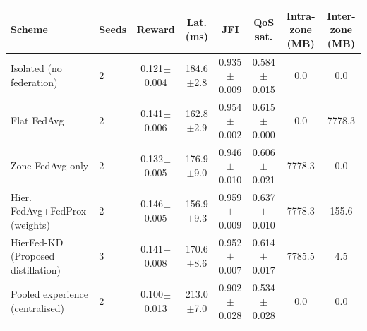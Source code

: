 \begin{tabular}{llcccccc}
\toprule
Scheme & Seeds & Reward & Lat. (ms) & JFI & QoS sat. & Intra-zone (MB) & Inter-zone (MB) \\
\midrule
Isolated (no federation) & 2 & 0.121{\tiny$\pm$0.004} & 184.6{\tiny$\pm$2.8} & 0.935{\tiny$\pm$0.009} & 0.584{\tiny$\pm$0.015} & 0.0 & 0.0 \\
Flat FedAvg & 2 & 0.141{\tiny$\pm$0.006} & 162.8{\tiny$\pm$2.9} & 0.954{\tiny$\pm$0.002} & 0.615{\tiny$\pm$0.000} & 0.0 & 7778.3 \\
Zone FedAvg only & 2 & 0.132{\tiny$\pm$0.005} & 176.9{\tiny$\pm$9.0} & 0.946{\tiny$\pm$0.010} & 0.606{\tiny$\pm$0.021} & 7778.3 & 0.0 \\
Hier. FedAvg+FedProx (weights) & 2 & 0.146{\tiny$\pm$0.005} & 156.9{\tiny$\pm$9.3} & 0.959{\tiny$\pm$0.009} & 0.637{\tiny$\pm$0.010} & 7778.3 & 155.6 \\
HierFed-KD (Proposed distillation) & 3 & 0.141{\tiny$\pm$0.008} & 170.6{\tiny$\pm$8.6} & 0.952{\tiny$\pm$0.007} & 0.614{\tiny$\pm$0.017} & 7785.5 & 4.5 \\
Pooled experience (centralised) & 2 & 0.100{\tiny$\pm$0.013} & 213.0{\tiny$\pm$7.0} & 0.902{\tiny$\pm$0.028} & 0.534{\tiny$\pm$0.028} & 0.0 & 0.0 \\
\bottomrule
\end{tabular}
